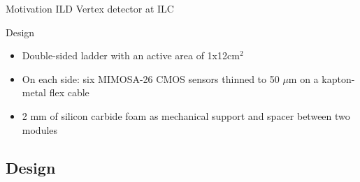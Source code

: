 \documentclass{beamer}
\begin{document}
\begin{frame}
  \vspace{-0.15cm}

  \begin{block}{Motivation}
    ILD Vertex detector at ILC
  \end{block}

  \vspace{-0.18cm}
  \begin{block}{Design}
    \begin{itemize}
      \item Double-sided ladder with an active area of 1x12cm$^2$
      \item On each side: six MIMOSA-26 CMOS sensors thinned to 50 $\mu$m on a kapton-metal flex cable
      \item 2 mm of silicon carbide foam as mechanical support and spacer between two modules
    \end{itemize}
  \end{block}
\end{frame}

\subsection{Design}
\end{document}
